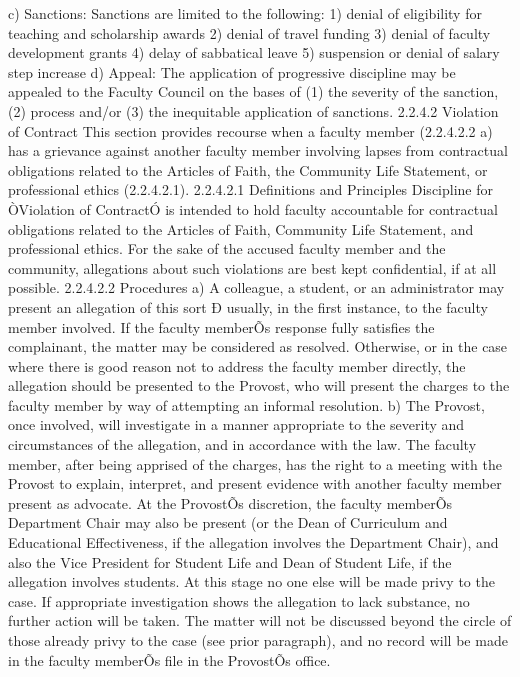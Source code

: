 \documentclass[letterpaper, 11pt]{article}
\begin{document}
c) Sanctions:
   Sanctions are limited to the following:
1) denial of eligibility for teaching and scholarship awards
2) denial of travel funding
3) denial of faculty development grants
4) delay of sabbatical leave
5) suspension or denial of salary step increase
d) Appeal:
   The application of progressive discipline may be appealed to the Faculty Council on the bases of (1) the severity of the sanction, (2) process and/or (3) the inequitable application of sanctions.
2.2.4.2 Violation of Contract
   This section provides recourse when a faculty member (2.2.4.2.2 a) has a grievance against another faculty member involving lapses from contractual obligations related to the Articles of Faith, the Community Life Statement, or professional ethics (2.2.4.2.1).
2.2.4.2.1 Definitions and Principles
   Discipline for ÒViolation of ContractÓ is intended to hold faculty accountable for contractual obligations related to the Articles of Faith, Community Life Statement, and professional ethics.  For the sake of the accused faculty member and the community, allegations about such violations are best kept confidential, if at all possible.
2.2.4.2.2 Procedures
a) A colleague, a student, or an administrator may present an allegation of this sort Ð usually, in the first instance, to the faculty member involved.  If the faculty memberÕs response fully satisfies the complainant, the matter may be considered as resolved.  Otherwise, or in the case where there is good reason not to address the faculty member directly, the allegation should be presented to the Provost, who will present the charges to the faculty member by way of attempting an informal resolution.
b) The Provost, once involved, will investigate in a manner appropriate to the severity and circumstances of the allegation, and in accordance with the law.  The faculty member, after being apprised of the charges, has the right to a meeting with the Provost to explain, interpret, and present evidence with another faculty member present as advocate.  At the ProvostÕs discretion, the faculty memberÕs Department Chair may also be present (or the Dean of Curriculum and Educational Effectiveness, if the allegation involves the Department Chair), and also the Vice President for Student Life and Dean of Student Life, if the allegation involves students.  At this stage no one else will be made privy to the case.
   If appropriate investigation shows the allegation to lack substance, no further action will be taken.  The matter will not be discussed beyond the circle of those already privy to the case (see prior paragraph), and no record will be made in the faculty memberÕs file in the ProvostÕs office.
\end{document}
